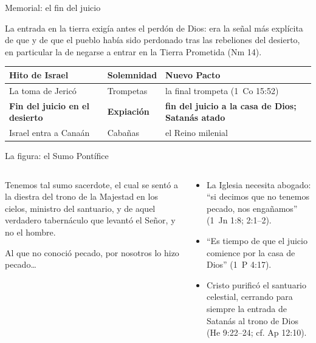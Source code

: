 \begin{frame}{Memorial: el fin del juicio}
{\scriptsize La entrada en la tierra exigía antes el perdón de Dios: era la señal más explícita de que  y de que el pueblo había sido perdonado tras las rebeliones del desierto, en particular la de negarse a entrar en la Tierra Prometida (Nm 14).\par\smallskip}
\scriptsize\renewcommand{\arraystretch}{1.1}
\begin{tabular}{@{}L{3.5cm}L{2.0cm}L{5.6cm}@{}}
\toprule
\textbf{Hito de Israel} & \textbf{Solemnidad} & \textbf{Nuevo Pacto} \\ \midrule
La toma de Jericó & Trompetas & la final trompeta (1~Co 15:52) \\
\textbf{Fin del juicio en el desierto} & \textbf{Expiación} & \textbf{fin del juicio a la casa de Dios; Satanás atado} \\
Israel entra a Canaán & Cabañas & el Reino milenial \\
\bottomrule
\end{tabular}
\end{frame}

\begin{frame}{La figura: el Sumo Pontífice}
\begin{columns}[t,onlytextwidth]
\begin{column}{0.50\textwidth}
\begin{cita}[fontupper=\scriptsize\itshape]Tenemos tal sumo sacerdote, el cual se sentó a la diestra del trono de la Majestad en los cielos, ministro del santuario, y de aquel verdadero tabernáculo que levantó el Señor, y no el hombre.\end{cita}
\begin{cita}[fontupper=\scriptsize\itshape]Al que no conoció pecado, por nosotros lo hizo pecado\ldots{}\end{cita}
\end{column}
\begin{column}{0.48\textwidth}\scriptsize
\begin{itemize}
\item La Iglesia necesita abogado: ``si decimos que no tenemos pecado, nos engañamos'' (1~Jn 1:8; 2:1--2).
\item ``Es tiempo de que el juicio comience por la casa de Dios'' (1~P 4:17).
\item Cristo purificó el santuario celestial, cerrando para siempre la entrada de Satanás al trono de Dios (He 9:22--24; cf. Ap 12:10).
\end{itemize}
\end{column}
\end{columns}
\end{frame}


